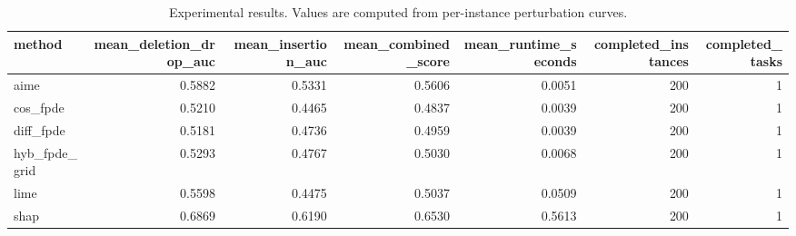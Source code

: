\begin{table}[t]
\caption{Experimental results. Values are computed from per-instance perturbation curves.}
\label{tab:main_results_computed}
\centering
\begin{tabular}{lrrrrrr}
\toprule
method & mean\_deletion\_drop\_auc & mean\_insertion\_auc & mean\_combined\_score & mean\_runtime\_seconds & completed\_instances & completed\_tasks \\
\midrule
aime & 0.5882 & 0.5331 & 0.5606 & 0.0051 & 200 & 1 \\
cos\_fpde & 0.5210 & 0.4465 & 0.4837 & 0.0039 & 200 & 1 \\
diff\_fpde & 0.5181 & 0.4736 & 0.4959 & 0.0039 & 200 & 1 \\
hyb\_fpde\_grid & 0.5293 & 0.4767 & 0.5030 & 0.0068 & 200 & 1 \\
lime & 0.5598 & 0.4475 & 0.5037 & 0.0509 & 200 & 1 \\
shap & 0.6869 & 0.6190 & 0.6530 & 0.5613 & 200 & 1 \\
\bottomrule
\end{tabular}

\end{table}
